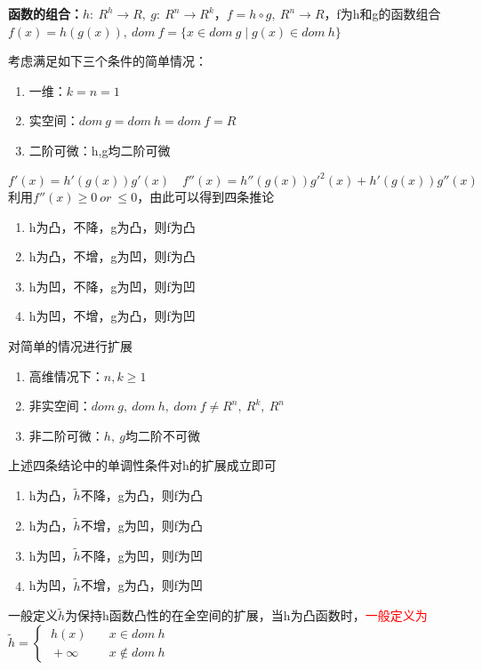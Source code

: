 \documentclass[11pt]{ctexart}         %
\newenvironment{myenumerate}{\begin{enumerate}[itemsep=0pt,parsep=0pt,topsep=0pt]}{\end{enumerate}}
\newcommand{\rebacklinespread}[1][-12pt]{\vspace{#1}}
\begin{document}
\textbf{函数的组合：}$h:\ R^h\to R,\ g:\ R^n\to R^k$，$f=h\circ g,\ R^n\to R$，f为h和g的函数组合
\phantom{函数的组合：}$f(x)=h(g(x)),\ dom\ f=\{x\in dom\ g\mid g(x)\in dom\ h\}$

考虑满足如下三个条件的简单情况：
\vspace{-12pt}
\begin{myenumerate}
	\item 一维：$k=n=1$
	\item 实空间：$dom\ g=dom\ h=dom\ f=R$
	\item 二阶可微：h,g均二阶可微
\end{myenumerate}
$$f'(x)=h'(g(x))g'(x)\quad f''(x)=h''(g(x))g'^2(x)+h'(g(x))g''(x)$$
利用$f''(x)\geq 0\ or\ \leq 0$，由此可以得到四条推论
\rebacklinespread
\begin{myenumerate}
	\item[\ding{172}]h为凸，不降，g为凸，则f为凸
	\item[\ding{173}]h为凸，不增，g为凹，则f为凸
	\item[\ding{174}]h为凹，不降，g为凹，则f为凹
	\item[\ding{175}]h为凹，不增，g为凸，则f为凹
\end{myenumerate}

\pagebreak
对简单的情况进行扩展
\rebacklinespread
\begin{myenumerate}
	\item 高维情况下：$n,k\geq 1$
	\item 非实空间：$dom\ g,\ dom\ h,\ dom\ f\neq R^n,\ R^k,\ R^n$
	\item 非二阶可微：$h,\ g$均二阶不可微
\end{myenumerate}

上述四条结论中的单调性条件对h的扩展成立即可
\rebacklinespread
\begin{myenumerate}
	\item[\ding{172}]h为凸，$\tilde{h}$不降，g为凸，则f为凸
	\item[\ding{173}]h为凸，$\tilde{h}$不增，g为凹，则f为凸
	\item[\ding{174}]h为凹，$\tilde{h}$不降，g为凹，则f为凹
	\item[\ding{175}]h为凹，$\tilde{h}$不增，g为凸，则f为凹
\end{myenumerate}

一般定义$\tilde{h}$为保持h函数凸性的在全空间的扩展，当h为凸函数时，\textcolor{red}{一般定义为}                                                 \\
$\tilde{h}=
\begin{cases}
	\ h(x)\quad &x\in dom\ h\\
	\ +\infty\quad &x\notin dom\ h
\end{cases}
$
\end{document}
